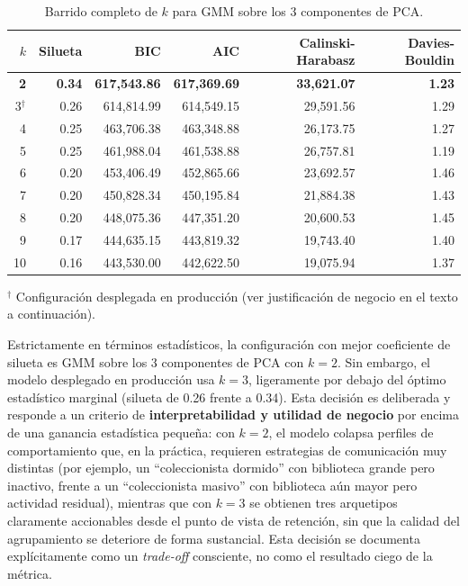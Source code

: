 \documentclass[11pt,letterpaper]{article}
\begin{document}
\begin{table}[h!]
\centering
\small
\caption{Barrido completo de $k$ para GMM sobre los 3 componentes de PCA.}
\label{tab:gmm_sweep}
\begin{tabular}{@{}rrrrrr@{}}
\toprule
$k$ & Silueta & BIC & AIC & Calinski-Harabasz & Davies-Bouldin \\
\midrule
\textbf{2}  & \textbf{0.34} & \textbf{617{,}543.86} & \textbf{617{,}369.69} & \textbf{33{,}621.07} & \textbf{1.23} \\
3$^\dagger$  & 0.26 & 614{,}814.99 & 614{,}549.15 & 29{,}591.56 & 1.29 \\
4  & 0.25 & 463{,}706.38 & 463{,}348.88 & 26{,}173.75 & 1.27 \\
5  & 0.25 & 461{,}988.04 & 461{,}538.88 & 26{,}757.81 & 1.19 \\
6  & 0.20 & 453{,}406.49 & 452{,}865.66 & 23{,}692.57 & 1.46 \\
7  & 0.20 & 450{,}828.34 & 450{,}195.84 & 21{,}884.38 & 1.43 \\
8  & 0.20 & 448{,}075.36 & 447{,}351.20 & 20{,}600.53 & 1.45 \\
9  & 0.17 & 444{,}635.15 & 443{,}819.32 & 19{,}743.40 & 1.40 \\
10 & 0.16 & 443{,}530.00 & 442{,}622.50 & 19{,}075.94 & 1.37 \\
\bottomrule
\end{tabular}

\vspace{0.4em}
\parbox{0.8\linewidth}{\footnotesize $^\dagger$ Configuración desplegada en producción (ver justificación de negocio en el texto a continuación).}
\end{table}

Estrictamente en términos estadísticos, la configuración con mejor coeficiente de silueta es GMM sobre los 3 componentes de PCA con $k=2$. Sin embargo, el modelo desplegado en producción usa \(k=3\), ligeramente por debajo del óptimo estadístico marginal (silueta de 0.26 frente a 0.34). Esta decisión es deliberada y responde a un criterio de \textbf{interpretabilidad y utilidad de negocio} por encima de una ganancia estadística pequeña: con $k=2$, el modelo colapsa perfiles de comportamiento que, en la práctica, requieren estrategias de comunicación muy distintas (por ejemplo, un ``coleccionista dormido'' con biblioteca grande pero inactivo, frente a un ``coleccionista masivo'' con biblioteca aún mayor pero actividad residual), mientras que con $k=3$ se obtienen tres arquetipos claramente accionables desde el punto de vista de retención, sin que la calidad del agrupamiento se deteriore de forma sustancial. Esta decisión se documenta explícitamente como un \textit{trade-off} consciente, no como el resultado ciego de la métrica.
\end{document}
